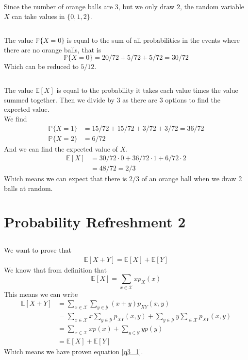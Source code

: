 \documentclass[a4paper]{article}
\begin{document}
\subsection{}
Since the number of orange balls are $3$, but we only draw $2$, the random variable $X$ can take values in $\{0,1,2\}$.

\subsection{}
The value $\mathbb{P}\{X=0\}$ is equal to the sum of all probabilities in the events where there are no orange balls, that is
$$\mathbb{P}\{X=0\}=20/72+5/72+5/72=30/72$$
Which can be reduced to $5/12$.

\subsection{}
The value $\mathbb{E}[X]$ is equal to the probability it takes each value times the value summed together. Then we divide by $3$ as there are $3$ options to find the expected value.\\
We find
\begin{align*}
  \mathbb{P}\{X=1\}&=15/72+15/72+3/72+3/72=36/72 \\
  \mathbb{P}\{X=2\}&=6/72
\end{align*}
And we can find the expected value of $X$.
\begin{align*}
  \mathbb{E}[X]&=30/72\cdot 0+36/72\cdot 1+6/72\cdot 2 \\
  &=48/72=2/3
\end{align*}
Which means we can expect that there is $2/3$ of an orange ball when we draw 2 balls at random.

\section{Probability Refreshment 2}
\subsection{}

We want to prove that
\begin{align}
\mathbb{E}[X+Y]=\mathbb{E}[X]+\mathbb{E}[Y]
\label{q3_1}
\end{align}
We know that from definition that
$$\mathbb{E}[X]=\sum_{x\in \mathcal{X}}xp_X(x)$$
This means we can write
\begin{align*}
\mathbb{E}[X+Y] &=\sum_{x\in \mathcal{X}}\sum_{y\in \mathcal{Y}} (x+y)p_{XY}(x,y)\\
                &= \sum_{x\in \mathcal{X}}x\sum_{y\in \mathcal{Y}} p_{XY}(x,y)+ \sum_{y\in \mathcal{Y}}y\sum_{\in \mathcal{X}} p_{XY}(x,y)\\
                &= \sum_{x\in \mathcal{X}}xp(x)+\sum_{y\in \mathcal{Y}}yp(y) \\
                &= \mathbb{E}[X]+\mathbb{E}[Y]
\end{align*}
Which means we have proven equation \ref{q3_1}.
\end{document}
